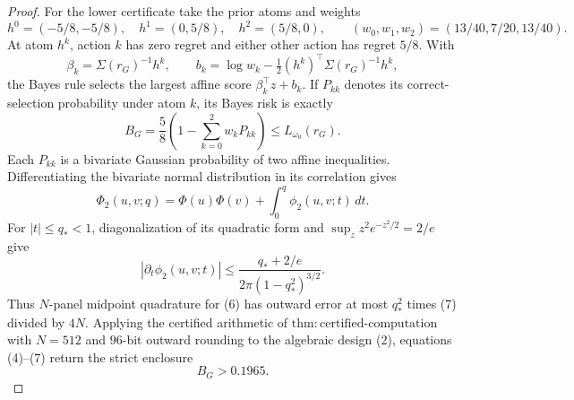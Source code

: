 \documentclass{article}
\begin{document}
\begin{proof}
For the lower certificate take the prior atoms and weights
\[
 h^0=(-5/8,-5/8),\quad h^1=(0,5/8),\quad h^2=(5/8,0),\qquad
 (w_0,w_1,w_2)=(13/40,7/20,13/40).                                  \tag{4}
\]
At atom \(h^k\), action \(k\) has zero regret and either other action has regret \(5/8\).  With
\[
 \beta_k=\Sigma(r_G)^{-1}h^k,\qquad
 b_k=\log w_k-\tfrac12(h^k)^\top\Sigma(r_G)^{-1}h^k,
\]
the Bayes rule selects the largest affine score \(\beta_k^\top z+b_k\).  If \(P_{kk}\) denotes its correct-selection probability under atom \(k\), its Bayes risk is exactly
\[
 B_G=\frac58\left(1-\sum_{k=0}^2w_kP_{kk}\right)\leq L_{\omega_0}(r_G). \tag{5}
\]
Each \(P_{kk}\) is a bivariate Gaussian probability of two affine inequalities.  Differentiating the bivariate normal distribution in its correlation gives
\[
 \Phi_2(u,v;q)=\Phi(u)\Phi(v)+\int_0^q\phi_2(u,v;t)\,dt.              \tag{6}
\]
For \(|t|\leq q_*<1\), diagonalization of its quadratic form and \(\sup_z z^2e^{-z^2/2}=2/e\) give
\[
 |\partial_t\phi_2(u,v;t)|\leq
 \frac{q_*+2/e}{2\pi(1-q_*^2)^{3/2}}.                               \tag{7}
\]
Thus \(N\)-panel midpoint quadrature for (6) has outward error at most \(q_*^2\) times (7) divided by \(4N\).  Applying the certified arithmetic of \(\mathrm{thm:certified\text{-}computation}\) with \(N=512\) and \(96\)-bit outward rounding to the algebraic design (2), equations (4)--(7) return the strict enclosure
\[
 B_G>0.1965.                                                         \tag{8}
\]


\end{proof}
\end{document}
